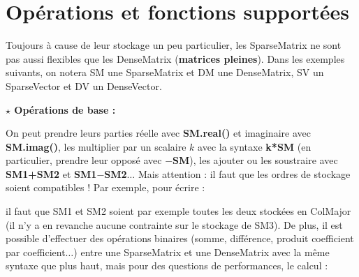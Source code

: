 \documentclass[11pt]{article}
\begin{document}
\vspace{5 mm}

\section{Opérations et fonctions supportées}

\noindent
Toujours à cause de leur stockage un peu particulier, les SparseMatrix ne sont pas aussi flexibles que les DenseMatrix (\textbf{matrices pleines}). Dans les exemples suivants, on notera SM une SparseMatrix et DM une DenseMatrix, SV un SparseVector et DV un DenseVector.

\vspace{5 mm}

\noindent
\textbf{$\star$ Opérations de base :}

\vspace{5 mm}

\noindent
On peut prendre leurs parties réelle avec \textbf{SM.real()} et imaginaire avec \textbf{SM.imag()}, les multiplier par un scalaire $k$ avec la syntaxe \textbf{k*SM} (en particulier, prendre leur opposé avec \textbf{$-$SM}), les ajouter ou les soustraire avec \textbf{SM1+SM2} et \textbf{SM1$-$SM2}$\ldots$ Mais attention : il faut que les ordres de stockage soient compatibles ! Par exemple, pour écrire :

\vspace{2 mm}	
	
\begin{center}
\end{center}

\vspace{2 mm}

\noindent
il faut que SM1 et SM2 soient par exemple toutes les deux stockées en ColMajor (il n'y a en revanche aucune contrainte sur le stockage de SM3). De plus, il est possible d'effectuer des opérations binaires (somme, différence, produit coefficient par coefficient$\ldots$) entre une SparseMatrix et une DenseMatrix avec la même syntaxe que plus haut, mais pour des questions de performances, le calcul :

\vspace{2 mm}	
	
\begin{center}
\end{center}
\end{document}
